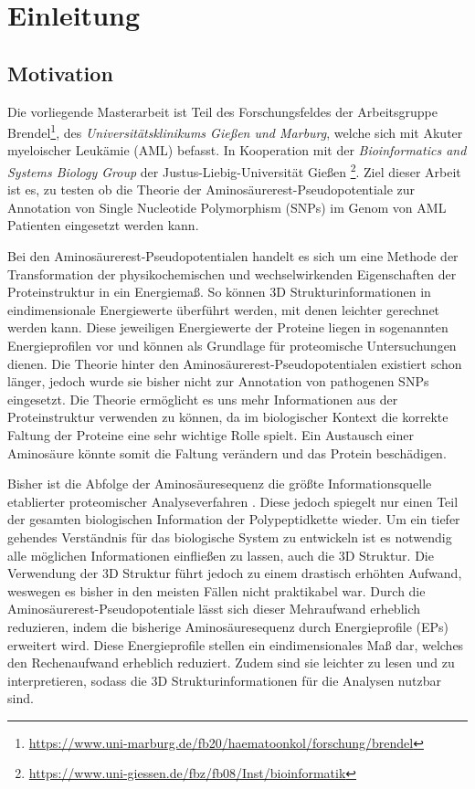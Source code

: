 \chapter{Einleitung}
\label{cha:Einleitung}

\section{Motivation}

Die vorliegende Masterarbeit ist Teil des Forschungsfeldes der Arbeitsgruppe Brendel\footnote{\url{https://www.uni-marburg.de/fb20/haematoonkol/forschung/brendel}}, des \emph{Universitätsklinikums Gießen und Marburg}, welche sich mit Akuter myeloischer Leukämie (AML) befasst. In Kooperation mit der \emph{Bioinformatics and Systems Biology Group} der Justus-Liebig-Universität Gießen \footnote{\url{https://www.uni-giessen.de/fbz/fb08/Inst/bioinformatik}}. Ziel dieser Arbeit ist es, zu testen ob die Theorie der Aminosäurerest-Pseudopotentiale zur Annotation von Single Nucleotide Polymorphism (SNPs) im Genom von AML Patienten eingesetzt werden kann.

Bei den Aminosäurerest-Pseudopotentialen handelt es sich um eine Methode der Transformation der physikochemischen und wechselwirkenden Eigenschaften der Proteinstruktur in ein Energiemaß. So können 3D Strukturinformationen in eindimensionale Energiewerte überführt werden, mit denen leichter gerechnet werden kann. Diese jeweiligen Energiewerte der Proteine liegen in sogenannten Energieprofilen vor und können als Grundlage für proteomische Untersuchungen dienen. Die Theorie hinter den Aminosäurerest-Pseudopotentialen existiert schon länger, jedoch wurde sie bisher nicht zur Annotation von pathogenen SNPs eingesetzt. Die Theorie ermöglicht es uns mehr Informationen aus der Proteinstruktur verwenden zu können, da im biologischer Kontext die korrekte Faltung der Proteine eine sehr wichtige Rolle spielt. Ein Austausch einer Aminosäure könnte somit die Faltung verändern und das Protein beschädigen. 

Bisher ist die Abfolge der Aminosäuresequenz die größte Informationsquelle etablierter proteomischer Analyseverfahren \cite{Landels.2015}. Diese jedoch spiegelt nur einen Teil der gesamten biologischen Information der Polypeptidkette wieder. Um ein tiefer gehendes Verständnis für das biologische System zu entwickeln ist es notwendig alle möglichen Informationen einfließen zu lassen, auch die 3D Struktur. Die Verwendung der 3D Struktur führt jedoch zu einem drastisch erhöhten Aufwand, weswegen es bisher in den meisten Fällen nicht praktikabel war. Durch die Aminosäurerest-Pseudopotentiale lässt sich dieser Mehraufwand erheblich reduzieren, indem die bisherige Aminosäuresequenz durch Energieprofile (EPs) erweitert wird. Diese Energieprofile stellen ein eindimensionales Maß dar, welches den Rechenaufwand erheblich reduziert. Zudem sind sie leichter zu lesen und zu interpretieren, sodass die 3D Strukturinformationen für die Analysen nutzbar sind.

